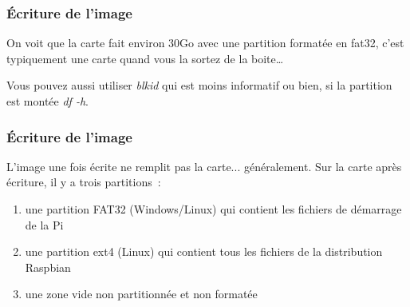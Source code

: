 \begin{frame}[containsverbatim]
\frametitle{\'Ecriture de l'image}

On voit que la carte fait environ 30Go avec une partition formatée en fat32, c'est typiquement une carte quand vous la sortez de la boite\dots 

Vous pouvez aussi utiliser \emph{blkid} qui est moins informatif ou bien, si la partition est montée \emph{df -h}.
\end{frame}

\begin{frame}[containsverbatim]
\frametitle{\'Ecriture de l'image}

L'image une fois écrite ne remplit pas la carte... généralement. Sur la carte après écriture, il y a trois partitions~:
\begin{enumerate}
 \item une partition FAT32 (Windows/Linux) qui contient les fichiers de démarrage de la Pi
 \item une partition ext4 (Linux) qui contient tous les fichiers de la distribution Raspbian
 \item une zone vide non partitionnée et  non formatée
 \end{enumerate}
  
\end{frame}